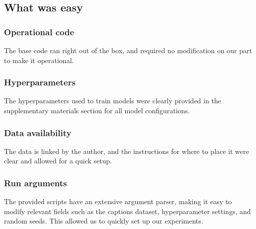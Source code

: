 \subsection{What was easy} %

\subsubsection{Operational code} The base code ran right out of the box, and required no modification on our part to make it operational.
\vspace*{-0.5cm}
\subsubsection{Hyperparameters} The hyperparameters used to train models were clearly provided in the supplementary materials section for all model configurations.
\vspace*{-0.5cm}
\subsubsection{Data availability} The data is linked by the author, and the instructions for where to place it were clear and allowed for a quick setup.
\vspace*{-0.5cm}
\subsubsection{Run arguments} The provided scripts have an extensive argument parser, making it easy to modify relevant fields such as the captions dataset, hyperparameter settings, and random seeds. This allowed us to quickly set up our experiments.


